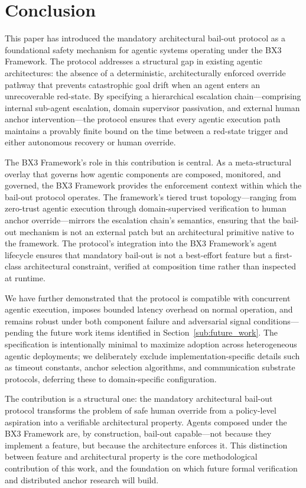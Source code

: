 \section{Conclusion}\label{sec:conclusion}

This paper has introduced the mandatory architectural bail-out protocol as a foundational safety mechanism for agentic systems operating under the BX3 Framework. The protocol addresses a structural gap in existing agentic architectures: the absence of a deterministic, architecturally enforced override pathway that prevents catastrophic goal drift when an agent enters an unrecoverable red-state. By specifying a hierarchical escalation chain—comprising internal sub-agent escalation, domain supervisor passivation, and external human anchor intervention—the protocol ensures that every agentic execution path maintains a provably finite bound on the time between a red-state trigger and either autonomous recovery or human override.

The BX3 Framework's role in this contribution is central. As a meta-structural overlay that governs how agentic components are composed, monitored, and governed, the BX3 Framework provides the enforcement context within which the bail-out protocol operates. The framework's tiered trust topology—ranging from zero-trust agentic execution through domain-supervised verification to human anchor override—mirrors the escalation chain's semantics, ensuring that the bail-out mechanism is not an external patch but an architectural primitive native to the framework. The protocol's integration into the BX3 Framework's agent lifecycle ensures that mandatory bail-out is not a best-effort feature but a first-class architectural constraint, verified at composition time rather than inspected at runtime.

We have further demonstrated that the protocol is compatible with concurrent agentic execution, imposes bounded latency overhead on normal operation, and remains robust under both component failure and adversarial signal conditions—pending the future work items identified in Section~\ref{sub:future_work}. The specification is intentionally minimal to maximize adoption across heterogeneous agentic deployments; we deliberately exclude implementation-specific details such as timeout constants, anchor selection algorithms, and communication substrate protocols, deferring these to domain-specific configuration.

The contribution is a structural one: the mandatory architectural bail-out protocol transforms the problem of safe human override from a policy-level aspiration into a verifiable architectural property. Agents composed under the BX3 Framework are, by construction, bail-out capable—not because they implement a feature, but because the architecture enforces it. This distinction between feature and architectural property is the core methodological contribution of this work, and the foundation on which future formal verification and distributed anchor research will build.

